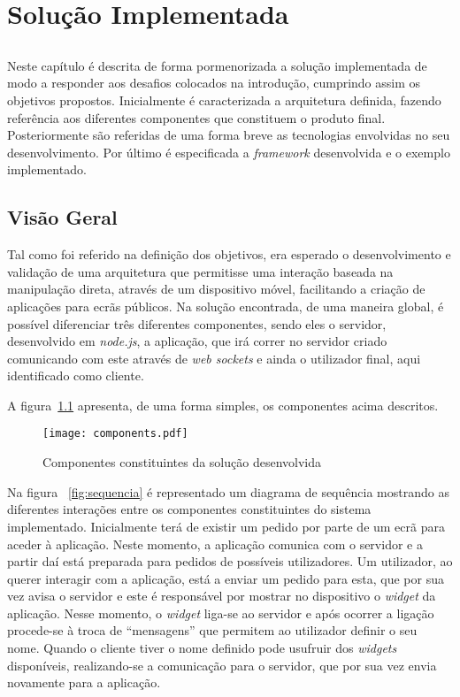 \chapter{Solução Implementada} \label{chap:sol}

\section*{}

Neste capítulo é descrita de forma pormenorizada a solução implementada de modo a responder aos desafios colocados na introdução, cumprindo assim os objetivos propostos.
Inicialmente é caracterizada a arquitetura definida, fazendo referência aos diferentes componentes que constituem o produto final. Posteriormente são referidas de uma forma breve as tecnologias envolvidas no seu desenvolvimento.
Por último é especificada a \textit{framework} desenvolvida e o exemplo implementado.

\section{Visão Geral} \label{sec:geral}

Tal como foi referido na definição dos objetivos, era esperado o desenvolvimento e validação de uma arquitetura que permitisse uma interação baseada na manipulação direta, através de um dispositivo móvel, facilitando a criação de aplicações para ecrãs públicos.  
Na solução encontrada, de uma maneira global, é possível diferenciar três diferentes componentes, sendo eles o servidor, desenvolvido em \textit{node.js}, a aplicação, que irá correr no servidor criado comunicando com este através de \textit{web sockets} e ainda o utilizador final, aqui identificado como cliente.

A figura~\ref{fig:componentes} apresenta, de uma forma simples, os componentes acima descritos.

\begin{figure}[ht]
\centering
\texttt{[image: components.pdf]}
\caption[Componentes] {Componentes constituintes da solução desenvolvida}
\label{fig:componentes}
\end{figure}

Na figura ~\ref{fig:sequencia} é representado um diagrama de sequência mostrando as diferentes interações entre os componentes constituintes do sistema implementado. Inicialmente terá de existir um pedido por parte de um ecrã para aceder à aplicação. Neste momento, a aplicação comunica com o servidor e a partir daí está preparada para pedidos de possíveis utilizadores. Um utilizador, ao querer interagir com a aplicação, está a enviar um pedido para esta, que por sua vez avisa o servidor e este é responsável por mostrar no dispositivo o \textit{widget} da aplicação. Nesse momento, o \textit{widget} liga-se ao servidor e após ocorrer a ligação procede-se à troca de ``mensagens'' que permitem ao utilizador definir o seu nome. Quando o cliente tiver o nome definido pode usufruir dos \textit{widgets} disponíveis, realizando-se a comunicação para o servidor, que por sua vez envia novamente para a aplicação.


